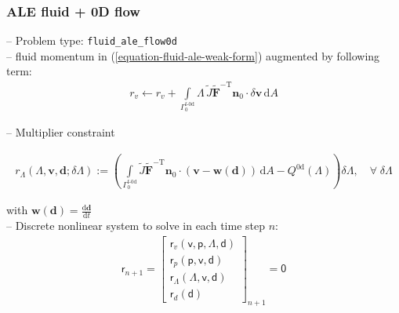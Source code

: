 \documentclass[a4paper,12pt]{report}
\newcommand{\fF}{\text{f}}
\newcommand{\bs}[1]{\boldsymbol{#1}}
\newcommand{\Gm}{\mathit{\Gamma}}
\newcommand{\ROP}{\bs{\mathsf{r}}}
\newcommand{\LMZ}{\bs{\mathsf{\Lambda}}}
\begin{document}
\subsubsection{ALE fluid + 0D flow}\label{ale-fluid-0d-flow}
-- Problem type: \verb"fluid_ale_flow0d"\\

-- fluid momentum in (\ref{equation-fluid-ale-weak-form}) augmented by following term:
\begin{equation}
\begin{aligned}
r_v \leftarrow r_v + \int\limits_{\Gm_0^{\fF\text{-}\mathrm{0d}}}\!\mathit{\Lambda}\,\widetilde{J}\widetilde{\bs{F}}^{-\mathrm{T}}\bs{n}_{0}\cdot\delta\bs{v}\,\mathrm{d}A
\end{aligned}
\end{equation}

-- Multiplier constraint

\begin{equation}
\begin{aligned}
r_{\mathit{\Lambda}}(\mathit{\Lambda},\bs{v},\bs{d};\delta\mathit{\Lambda}):= \left(\int\limits_{\Gm_0^{\mathrm{\fF\text{-}0d}}}\! \widetilde{J}\widetilde{\bs{F}}^{-\mathrm{T}}\bs{n}_{0}\cdot(\bs{v}-\bs{w}(\bs{d}))\,\mathrm{d}A - Q^{\mathrm{0d}}(\mathit{\Lambda})\right) \delta\mathit{\Lambda}, \quad \forall \; \delta\mathit{\Lambda}
\end{aligned}
\end{equation}

with $\bs{w}(\bs{d})=\frac{\mathrm{d}\bs{d}}{\mathrm{d}t}$\\

-- Discrete nonlinear system to solve in each time step $n$:
\begin{equation}
\label{equation-nonlin-sys-fluid-ale-0d}
\begin{aligned}
\ROP_{n+1} = \begin{bmatrix} \ROP_{v}(\bs{\mathsf{v}},\bs{\mathsf{p}},\LMZ,\bs{\mathsf{d}}) \\ \ROP_{p}(\bs{\mathsf{p}},\bs{\mathsf{v}},\bs{\mathsf{d}}) \\ \ROP_{\mathit{\Lambda}}(\LMZ,\bs{\mathsf{v}},\bs{\mathsf{d}}) \\ \ROP_{d}(\bs{\mathsf{d}}) \end{bmatrix}_{n+1} = \bs{\mathsf{0}}
\end{aligned}
\end{equation}
\end{document}
